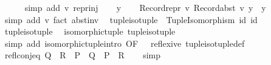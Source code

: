 \begin{isabellebody}
\ \ \ \ \isamarkupfalse%
\ {\isacharparenleft}{\kern0pt}simp\ add{\isacharcolon}{\kern0pt}\ v\ repr{\isacharunderscore}{\kern0pt}inj{\isacharparenright}{\kern0pt}\isanewline
{}\isamarkupfalse%
\isanewline
\ \ \isamarkupfalse%
\ y\isanewline
\ \ \isamarkupfalse%
\ {\isachardoublequoteopen}Record{\isachardot}{\kern0pt}repr\ v\ {\isacharparenleft}{\kern0pt}Record{\isachardot}{\kern0pt}abst\ v\ y{\isacharparenright}{\kern0pt}\ {\isacharequal}{\kern0pt}\ y{\isachardoublequoteclose}\isanewline
\ \ \ \ \isamarkupfalse%
\ {\isacharparenleft}{\kern0pt}simp\ add{\isacharcolon}{\kern0pt}\ v{\isacharparenright}{\kern0pt}\ {\isacharparenleft}{\kern0pt}fact\ abst{\isacharunderscore}{\kern0pt}inv{\isacharparenright}{\kern0pt}\isanewline
{}\isamarkupfalse%
%
\endisatagproof
{\isafoldproof}%
%
\isadelimproof
\isanewline
%
\endisadelimproof
\isanewline
{}\isamarkupfalse%
\isanewline
\ \ {\isachardoublequoteopen}tuple{\isacharunderscore}{\kern0pt}iso{\isacharunderscore}{\kern0pt}tuple\ {\isasymequiv}\ Tuple{\isacharunderscore}{\kern0pt}Isomorphism\ id\ id{\isachardoublequoteclose}\isanewline
\isanewline
{}\isamarkupfalse%
\ tuple{\isacharunderscore}{\kern0pt}iso{\isacharunderscore}{\kern0pt}tuple{\isacharcolon}{\kern0pt}\isanewline
\ \ {\isachardoublequoteopen}isomorphic{\isacharunderscore}{\kern0pt}tuple\ tuple{\isacharunderscore}{\kern0pt}iso{\isacharunderscore}{\kern0pt}tuple{\isachardoublequoteclose}\isanewline
%
\isadelimproof
\ \ %
\endisadelimproof
%
\isatagproof
{}\isamarkupfalse%
\ {\isacharparenleft}{\kern0pt}simp\ add{\isacharcolon}{\kern0pt}\ isomorphic{\isacharunderscore}{\kern0pt}tuple{\isacharunderscore}{\kern0pt}intro\ {\isacharbrackleft}{\kern0pt}OF\ {\isacharunderscore}{\kern0pt}\ {\isacharunderscore}{\kern0pt}\ reflexive{\isacharbrackright}{\kern0pt}\ tuple{\isacharunderscore}{\kern0pt}iso{\isacharunderscore}{\kern0pt}tuple{\isacharunderscore}{\kern0pt}def{\isacharparenright}{\kern0pt}%
\endisatagproof
{\isafoldproof}%
%
\isadelimproof
\isanewline
%
\endisadelimproof
\isanewline
{}\isamarkupfalse%
\ refl{\isacharunderscore}{\kern0pt}conj{\isacharunderscore}{\kern0pt}eq{\isacharcolon}{\kern0pt}\ {\isachardoublequoteopen}Q\ {\isacharequal}{\kern0pt}\ R\ {\isasymLongrightarrow}\ P\ {\isasymand}\ Q\ {\isasymlongleftrightarrow}\ P\ {\isasymand}\ R{\isachardoublequoteclose}\isanewline
%
\isadelimproof
\ \ %
\endisadelimproof
%
\isatagproof
{}\isamarkupfalse%
\ simp%
\endisatagproof
{\isafoldproof}%

\end{isabellebody}
